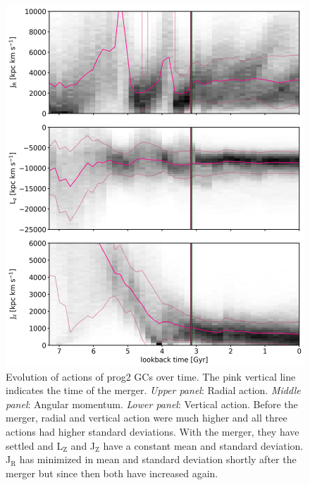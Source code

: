 \begin{figure}[htbp]
\captionsetup{format=plain}
    \centering
	\includegraphics[width=\textwidth]{plots/Dynamics/prog2/action_time_evolution_hist_mean_prog2.png}

	\caption{Evolution of actions of prog2 \acp{GC} over time. The pink vertical line indicates the time of the merger. \textit{Upper panel}: Radial action. \textit{Middle panel}: Angular momentum. \textit{Lower panel}: Vertical action. Before the merger, radial and vertical action were much higher and all three actions had higher standard deviations. With the merger, they have settled and L$_\mathrm{Z}$ and J$_\mathrm{Z}$ have a constant mean and standard deviation. J$_\mathrm{R}$ has minimized in mean and standard deviation shortly after the merger but since then both have increased again.}\label{fig:actions_time_evolution_prog2}
\end{figure}

